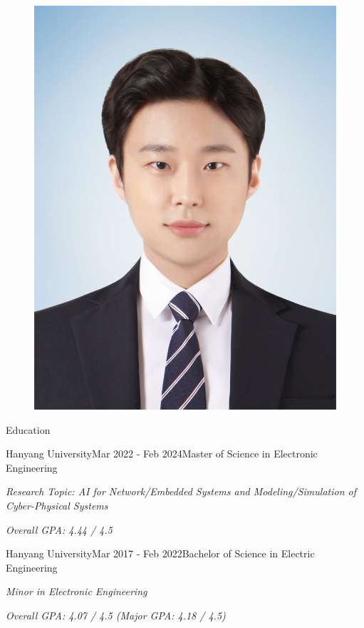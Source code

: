\documentclass[
	11pt, %
]{resume} %
\begin{document}
\begin{figure}[h!]
    \centerline{\includegraphics[width=0.3\columnwidth]{../../img/2.jpg}}
  \end{figure}


\begin{rSection}{Education}
	\begin{rSubsection}{Hanyang University}{Mar 2022 - Feb 2024}{Master of Science in Electronic Engineering}{}
		\item \textit{Research Topic: AI for Network/Embedded Systems and Modeling/Simulation of Cyber-Physical Systems}
		\item \textit{Overall GPA: 4.44 / 4.5}
	\end{rSubsection}

	\begin{rSubsection}{Hanyang University}{Mar 2017 - Feb 2022}{Bachelor of Science in Electric Engineering}{}
		\item \textit{Minor in Electronic Engineering}
		\item \textit{Overall GPA: 4.07 / 4.5 (Major GPA: 4.18 / 4.5)}
	\end{rSubsection}

\end{rSection}

\end{document}
